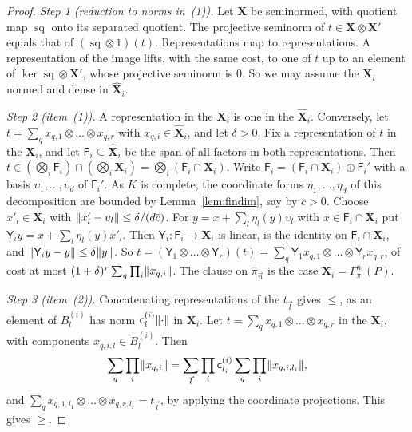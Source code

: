 \begin{proof}
\emph{Step 1 (reduction to norms in~(1)).} Let $\mathbf X$ be seminormed, with quotient map $\operatorname{sq}$ onto its separated quotient. The projective seminorm of $t\in\mathbf X\otimes\mathbf X'$ equals that of $(\operatorname{sq}\otimes1)(t)$. Representations map to representations. A representation of the image lifts, with the same cost, to one of $t$ up to an element of $\ker\operatorname{sq}\otimes\mathbf X'$, whose projective seminorm is $0$. So we may assume the $\mathbf X_i$ normed and dense in $\widehat{\mathbf X}_i$.

\emph{Step 2 (item~(1)).} A representation in the $\mathbf X_i$ is one in the $\widehat{\mathbf X}_i$. Conversely, let $t=\sum_qx_{q,1}\otimes\dots\otimes x_{q,r}$ with $x_{q,i}\in\widehat{\mathbf X}_i$, and let $\delta>0$. Fix a representation of $t$ in the $\mathbf X_i$, and let $\mathsf F_i\subseteq\widehat{\mathbf X}_i$ be the span of all factors in both representations. Then $t\in(\bigotimes_i\mathsf F_i)\cap(\bigotimes_i\mathbf X_i)=\bigotimes_i(\mathsf F_i\cap\mathbf X_i)$. Write $\mathsf F_i=(\mathsf F_i\cap\mathbf X_i)\oplus\mathsf F_i'$ with a basis $\upsilon_1,\dots,\upsilon_d$ of $\mathsf F_i'$. As $K$ is complete, the coordinate forms $\eta_1,\dots,\eta_d$ of this decomposition are bounded by Lemma~\ref{lem:findim}, say by $\overline c>0$. Choose $x'_l\in\mathbf X_i$ with $\lVert x'_l-\upsilon_l\rVert\le\delta/(d\overline c)$. For $y=x+\sum_l\eta_l(y)\upsilon_l$ with $x\in\mathsf F_i\cap\mathbf X_i$ put $\mathsf Y_iy=x+\sum_l\eta_l(y)x'_l$. Then $\mathsf Y_i\colon\mathsf F_i\to\mathbf X_i$ is linear, is the identity on $\mathsf F_i\cap\mathbf X_i$, and $\lVert \mathsf Y_iy-y\rVert\le\delta\lVert y\rVert$. So $t=(\mathsf Y_1\otimes\dots\otimes\mathsf Y_r)(t)=\sum_q\mathsf Y_1x_{q,1}\otimes\dots\otimes\mathsf Y_rx_{q,r}$, of cost at most $(1+\delta)^r\sum_q\prod_i\lVert x_{q,i}\rVert$. The clause on $\widehat\pi_{\vec n}$ is the case $\mathbf X_i=\Gamma^{n_i}_\pi(P)$.

\emph{Step 3 (item~(2)).} Concatenating representations of the $t_{\vec l}$ gives $\le$, as an element of $B^{(i)}_l$ has norm $\mathsf c^{(i)}_l\lVert \cdot\rVert$ in $\mathbf X_i$. Let $t=\sum_qx_{q,1}\otimes\dots\otimes x_{q,r}$ in the $\mathbf X_i$, with components $x_{q,i,l}\in B^{(i)}_l$. Then
\[
 \sum_q\prod_i\lVert x_{q,i}\rVert=\sum_{\vec l}\prod_i\mathsf c^{(i)}_{l_i}\sum_q\prod_i\lVert x_{q,i,l_i}\rVert,
\]
and $\sum_qx_{q,1,l_1}\otimes\dots\otimes x_{q,r,l_r}=t_{\vec l}$, by applying the coordinate projections. This gives $\ge$.
\end{proof}

